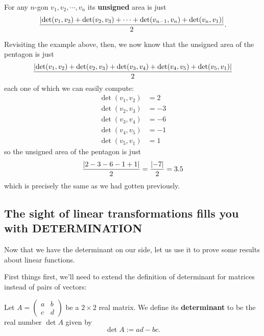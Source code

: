 \begin{cor}
	For any $n$-gon $v_1,v_2,\cdots,v_n$ its \textbf{unsigned} area is just
	\[\frac{\left\vert\det(v_1,v_2)+\det(v_2,v_3)+\cdots+\det(v_{n-1},v_n)+\det(v_n,v_1)\right\vert}{2}.\]
\end{cor}

\begin{ex}
	Revisiting the example above, then, we now know that the unsigned area of the pentagon is just 
	\[\frac{\left\vert\det(v_1,v_2)+\det(v_2,v_3)+\det(v_3,v_4)+\det(v_4,v_5)+\det(v_5,v_1)\right\vert}{2}\]each one of which we can easily compute:
	\begin{align*}
		\det(v_1,v_2)&=2\\
		\det(v_2,v_3)&=-3\\
		\det(v_3,v_4)&=-6\\
		\det(v_4,v_5)&=-1\\
		\det(v_5,v_1)&=1
	\end{align*}so the unsigned area of the pentagon is just 
	\[\frac{\left\vert2-3-6-1+1\right\vert}{2}=\frac{\left\vert-7\right\vert}{2}=3.5\]which is precisely the same as we had gotten previously.
\end{ex}

\newpage
\subsection{The sight of linear transformations fills you with DETERMINATION}

Now that we have the determinant on our side, let us use it to prove some results about linear functions.

First things first, we'll need to extend the definition of determinant for matrices instead of pairs of vectors:

\begin{df}
	Let $A=\begin{pmatrix}
	a&b\\c&d
	\end{pmatrix}$ be a $2\times 2$ real matrix. We define its \textbf{determinant} to be the real number $\det A$ given by
	\[\det A:=ad-bc.\]
\end{df}


